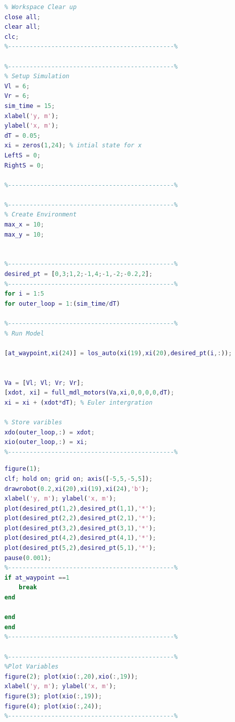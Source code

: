 \documentclass{l4proj}
\begin{document}
\begin{lstlisting}[language=Matlab, float, caption={Task 1 , Final  Code}, label=lst:callahan]       
    %----------------------------------------------%
    % Workspace Clear up
    close all;
    clear all;
    clc;
    %----------------------------------------------%
    
    %----------------------------------------------%
    % Setup Simulation
    Vl = 6;
    Vr = 6;
    sim_time = 15;
    xlabel('y, m'); 
    ylabel('x, m');
    dT = 0.05;
    xi = zeros(1,24); % intial state for x
    LeftS = 0;
    RightS = 0;
    
    %----------------------------------------------%
    
    %----------------------------------------------%
    % Create Environment
    max_x = 10;
    max_y = 10;
    
    
    %----------------------------------------------%
    desired_pt = [0,3;1,2;-1,4;-1,-2;-0.2,2];
    %----------------------------------------------%
    for i = 1:5
    for outer_loop = 1:(sim_time/dT)

    %----------------------------------------------%
    % Run Model
    
    [at_waypoint,xi(24)] = los_auto(xi(19),xi(20),desired_pt(i,:));
    
    
    Va = [Vl; Vl; Vr; Vr];
    [xdot, xi] = full_mdl_motors(Va,xi,0,0,0,0,dT);   
    xi = xi + (xdot*dT); % Euler intergration
    
    % Store varibles
    xdo(outer_loop,:) = xdot;
    xio(outer_loop,:) = xi;
    %----------------------------------------------%
 \end{lstlisting}
\begin{lstlisting}[language=Matlab, float, caption={Task 1 , Final code}, label=lst:callahan]       
    %----------------------------------------------%
    figure(1);
    clf; hold on; grid on; axis([-5,5,-5,5]);
    drawrobot(0.2,xi(20),xi(19),xi(24),'b');
    xlabel('y, m'); ylabel('x, m');
    plot(desired_pt(1,2),desired_pt(1,1),'*');
    plot(desired_pt(2,2),desired_pt(2,1),'*');
    plot(desired_pt(3,2),desired_pt(3,1),'*');
    plot(desired_pt(4,2),desired_pt(4,1),'*');
    plot(desired_pt(5,2),desired_pt(5,1),'*');
    pause(0.001);
    %----------------------------------------------%
    if at_waypoint ==1
        break
    end

    end
    end
    %----------------------------------------------%
    
    %----------------------------------------------%
    %Plot Variables
    figure(2); plot(xio(:,20),xio(:,19));
    xlabel('y, m'); ylabel('x, m');
    figure(3); plot(xio(:,19));
    figure(4); plot(xio(:,24));
    %----------------------------------------------%
 \end{lstlisting}
 
\end{document}
